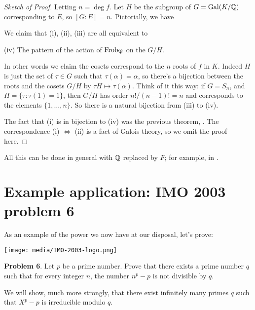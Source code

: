 \begin{proof}[Sketch of Proof]
	Letting $n = \deg f$.
	Let $H$ be the subgroup of $G = \operatorname{Gal}(K/\mathbb Q)$ corresponding to $E$, so $[G:E] = n$.
	Pictorially, we have
	\begin{center}
	\end{center}
	We claim that (i), (ii), (iii) are all equivalent to
	\begin{center}
		(iv) The pattern of the action of $\mathrm{Frob}_{\mathfrak P}$ on the $G/H$.
	\end{center}
	In other words we claim the cosets correspond to the $n$ roots of $f$ in $K$.
	Indeed $H$ is just the set of $\tau \in G$ such that $\tau(\alpha)=\alpha$,
	so there's a bijection between the roots and the cosets $G/H$
	by $\tau H \mapsto \tau(\alpha)$.
	Think of it this way: if $G = S_n$, and $H = \{\tau : \tau(1) = 1\}$,
	then $G/H$ has order $n! / (n-1)! = n$ and corresponds to the elements $\{1, \dots, n\}$.
	So there is a natural bijection from (iii) to (iv).

	The fact that (i) is in bijection to (iv) was the previous theorem,
	.
	The correspondence (i) $\iff$ (ii) is a fact of Galois theory,
	so we omit the proof here.
\end{proof}

All this can be done in general with $\mathbb Q$ replaced by $F$;
for example, in \cite{ref:lenstra_chebotarev}.

\section{Example application: IMO 2003 problem 6}
As an example of the power we now have at our disposal, let's prove:

\begin{center}
	\begin{minipage}{4.5cm}
		\texttt{[image: media/IMO-2003-logo.png]}
	\end{minipage}%
	\begin{minipage}{10cm}
		\textbf{Problem 6}.
		Let $p$ be a prime number.
		Prove that there exists a prime number $q$ such that for every integer $n$,
		the number $n^p-p$ is not divisible by $q$.
	\end{minipage}
\end{center}
We will show, much more strongly, that there exist infinitely many primes $q$
such that $X^p-p$ is irreducible modulo $q$.


